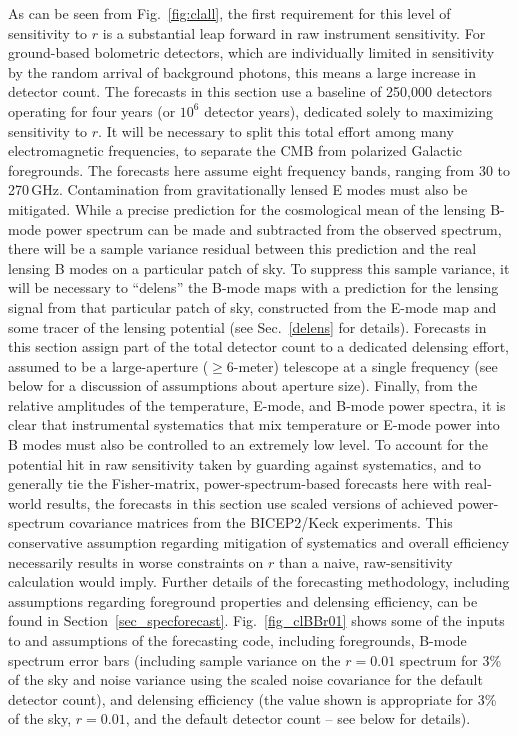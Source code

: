 As can be seen from Fig.~\ref{fig:clall}, the first requirement for this level of sensitivity to $r$ is a substantial leap forward in raw instrument sensitivity. 
For ground-based bolometric detectors, which are individually limited in sensitivity by the random arrival of background photons, this means a large increase in detector count. 
The forecasts in this section use a baseline of 250,000 detectors operating for four years (or $10^6$ detector years), dedicated solely to maximizing sensitivity to $r$. 
It will be necessary to split this total effort among many electromagnetic frequencies, to separate the CMB from polarized Galactic foregrounds. %
The forecasts here assume eight frequency bands, ranging from 30 to 270\,GHz.
Contamination from gravitationally lensed E modes must also be mitigated.
While a precise prediction for the cosmological mean of the lensing B-mode power spectrum can be made and subtracted from the observed spectrum, there will be a sample variance residual between this prediction and the real lensing B modes on a particular patch of sky.
To suppress this sample variance, it will be necessary to ``delens'' the B-mode maps with a prediction for the lensing signal from that particular patch of sky, constructed from the E-mode map and some tracer of the lensing potential (see Sec.~\ref{delens} for details).
Forecasts in this section assign part of the total detector count to a dedicated delensing effort, assumed to be a large-aperture ($\ge 6$-meter) telescope at a single frequency
(see below for a discussion of assumptions about aperture size).
Finally, from the relative amplitudes of the temperature, E-mode, and B-mode power spectra, it is clear that instrumental systematics that mix temperature or E-mode power into B modes must also be controlled to an extremely low level. 
To account for the potential hit in raw sensitivity taken by guarding against systematics, and to generally tie the Fisher-matrix, power-spectrum-based forecasts here with real-world results, the forecasts in this section use scaled versions of achieved power-spectrum covariance matrices from the BICEP2/Keck experiments.
This conservative assumption regarding mitigation of systematics and overall efficiency necessarily results in worse constraints on $r$ than a naive, raw-sensitivity calculation would imply.
Further details of the forecasting methodology, including assumptions regarding foreground properties and delensing efficiency, can be found in Section~\ref{sec_specforecast}.
Fig.~\ref{fig_clBBr01} shows some of the inputs to and assumptions of the forecasting code, including foregrounds, B-mode spectrum error bars (including sample variance on the $r=0.01$ spectrum for 3\% of the sky and noise variance using the scaled noise covariance for the default detector count), and delensing efficiency (the value shown is appropriate for 3\% of the sky, $r=0.01$, and the default detector count -- see below for details).


